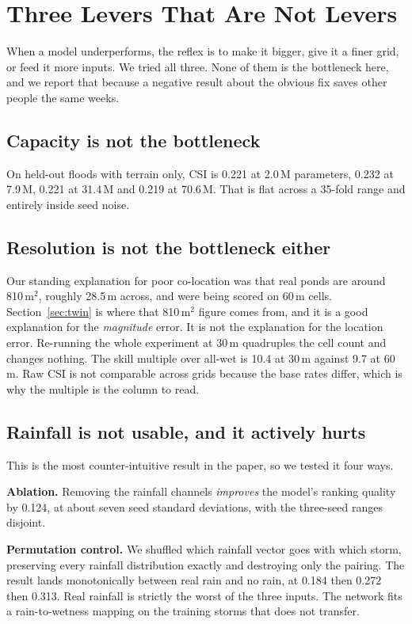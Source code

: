 \section{Three Levers That Are Not Levers}
\label{sec:levers}

When a model underperforms, the reflex is to make it bigger, give it a finer grid, or feed it more
inputs. We tried all three. None of them is the bottleneck here, and we report that because a
negative result about the obvious fix saves other people the same weeks.

\subsection{Capacity is not the bottleneck}
On held-out floods with terrain only, CSI is 0.221 at 2.0\,M parameters, 0.232 at 7.9\,M, 0.221 at
31.4\,M and 0.219 at 70.6\,M. That is flat across a 35-fold range and entirely inside seed noise.

\subsection{Resolution is not the bottleneck either}
Our standing explanation for poor co-location was that real ponds are around 810\,m$^2$, roughly
28.5\,m across, and were being scored on 60\,m cells. Section~\ref{sec:twin} is where that 810\,m$^2$
figure comes from, and it is a good explanation for the \emph{magnitude} error. It is not the
explanation for the location error. Re-running the whole experiment at 30\,m quadruples the cell
count and changes nothing. The skill multiple over all-wet is 10.4 at 30\,m against 9.7 at 60\,m.
Raw CSI is not comparable across grids because the base rates differ, which is why the multiple is
the column to read.

\subsection{Rainfall is not usable, and it actively hurts}
This is the most counter-intuitive result in the paper, so we tested it four ways.

\textbf{Ablation.} Removing the rainfall channels \emph{improves} the model's ranking quality by
0.124, at about seven seed standard deviations, with the three-seed ranges disjoint.

\textbf{Permutation control.} We shuffled which rainfall vector goes with which storm, preserving
every rainfall distribution exactly and destroying only the pairing. The result lands monotonically
between real rain and no rain, at 0.184 then 0.272 then 0.313. Real rainfall is strictly the worst
of the three inputs. The network fits a rain-to-wetness mapping on the training storms that does
not transfer.

